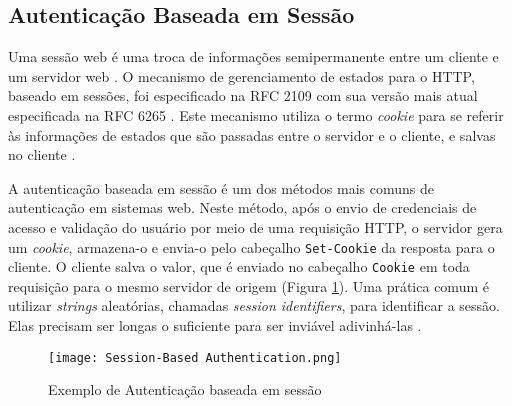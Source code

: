\subsection{Autenticação Baseada em Sessão}

Uma sessão web é uma troca de informações semipermanente entre um cliente e um servidor web 
\cite{CALZAVARA2017}. O mecanismo de gerenciamento de estados para o HTTP, baseado em sessões, foi 
especificado na RFC 2109 \cite{RFC2109} com sua versão mais atual especificada na RFC 6265 
\cite{RFC6265}. Este mecanismo utiliza o termo \emph{cookie} para se referir às informações de 
estados que são passadas entre o servidor e o cliente, e salvas no cliente \cite{RFC2109}. 

A autenticação baseada em sessão é um dos métodos mais comuns de autenticação em sistemas web. 
Neste método, após o envio de credenciais de acesso e validação do usuário por meio de uma requisição 
HTTP, o servidor gera um \emph{cookie}, armazena-o e envia-o pelo cabeçalho \texttt{Set-Cookie} da 
resposta para o cliente. O cliente salva o valor, que é enviado no cabeçalho \texttt{Cookie} em 
toda requisição para o mesmo servidor de origem \cite{PAPATHANASAKI2022} 
(Figura \ref{fig:sessionAuth}). Uma prática comum é utilizar \emph{strings} aleatórias, chamadas 
\emph{session identifiers}, para identificar a sessão. Elas precisam ser longas o suficiente para 
ser inviável adivinhá-las \cite{DRHOVA2018}.

\begin{figure}[ht]
  \centering
  \texttt{[image: Session-Based Authentication.png]}
  \caption{Exemplo de Autenticação baseada em sessão}
  \label{fig:sessionAuth}
\end{figure}

\

\
